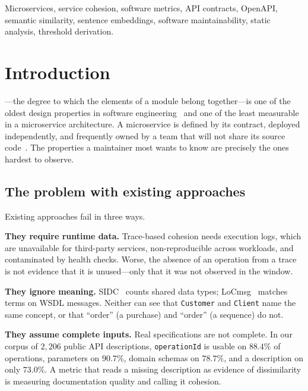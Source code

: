 \documentclass[journal]{IEEEtran}
\newcommand{\code}[1]{\texttt{\small #1}}
\begin{document}
\begin{IEEEkeywords}
Microservices, service cohesion, software metrics, API contracts, OpenAPI,
semantic similarity, sentence embeddings, software maintainability, static
analysis, threshold derivation.
\end{IEEEkeywords}

\section{Introduction}
---the degree to which the elements of a module belong
together---is one of the oldest design properties in software
engineering~\cite{stevens1974structured} and one of the least measurable in a
microservice architecture. A microservice is defined by its contract, deployed
independently, and frequently owned by a team that will not share its source
code~\cite{newman2021building}. The properties a maintainer most wants to know
are precisely the ones hardest to observe.

\subsection{The problem with existing approaches}
Existing approaches fail in three ways.

\textbf{They require runtime data.} Trace-based cohesion needs execution logs,
which are unavailable for third-party services, non-reproducible across
workloads, and contaminated by health checks. Worse, the absence of an operation
from a trace is not evidence that it is unused---only that it was not observed
in the window.

\textbf{They ignore meaning.} SIDC~\cite{perepletchikov2007cohesion} counts
shared data types; LoCmsg~\cite{athanasopoulos2015cohesion} matches terms on
WSDL messages. Neither can see that \code{Customer} and \code{Client} name the
same concept, or that ``order'' (a purchase) and ``order'' (a sequence) do not.

\textbf{They assume complete inputs.} Real specifications are not complete. In
our corpus of $2{,}206$ public API descriptions, \code{operationId} is usable on
$88.4\%$ of operations, parameters on $90.7\%$, domain schemas on $78.7\%$, and
a description on only $73.0\%$. A metric that reads a missing description as
evidence of dissimilarity is measuring documentation quality and calling it
cohesion.
\end{document}
